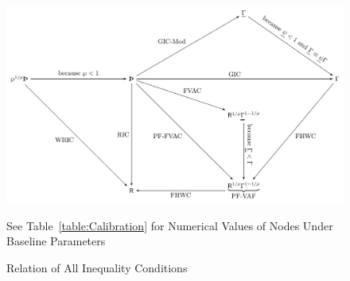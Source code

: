 \begin{figure}[ht]
  \centerline{
    \includegraphics[width=6.0in]{Figures/Inequalities}
  }
  \caption{Relation of All Inequality Conditions} \label{fig:Inequalities}
\centerline{See Table~\ref{table:Calibration} for Numerical Values of Nodes Under Baseline Parameters}
\end{figure}
